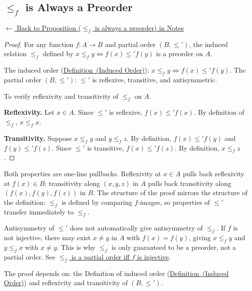 
\subsection*{$\leq_f$ is Always a Preorder}
\label{prf:induced-preorder}

\begin{remark*}[Return]
\hyperref[prop:induced-preorder]{$\leftarrow$ Back to Proposition ($\leq_f$ is always a preorder) in Notes}
\end{remark*}

\begin{proof}
\Claim For any function $f : A \to B$ and partial order $(B, \leq')$, the induced relation $\leq_f$ defined by $x \leq_f y \Leftrightarrow f(x) \leq' f(y)$ is a preorder on $A$.

\Given The induced order (\hyperref[def:induced-order]{Definition~(Induced Order)}):
$x \leq_f y \Leftrightarrow f(x) \leq' f(y)$. The partial order $(B, \leq')$:
$\leq'$ is reflexive, transitive, and antisymmetric.

\Goal To verify reflexivity and transitivity of $\leq_f$ on $A$.

\medskip
\noindent\textbf{Reflexivity.} Let $x \in A$. Since $\leq'$ is reflexive,
$f(x) \leq' f(x)$. By definition of $\leq_f$, $x \leq_f x$.

\medskip
\noindent\textbf{Transitivity.} Suppose $x \leq_f y$ and $y \leq_f z$. By
definition, $f(x) \leq' f(y)$ and $f(y) \leq' f(z)$. Since $\leq'$ is
transitive, $f(x) \leq' f(z)$. By definition, $x \leq_f z$. \AsReq
\end{proof}

\begin{remark*}
Both properties are one-line pullbacks. Reflexivity at $x \in A$ pulls back
reflexivity at $f(x) \in B$; transitivity along $(x, y, z)$ in $A$ pulls back
transitivity along $(f(x), f(y), f(z))$ in $B$. The structure of the proof
mirrors the structure of the definition: $\leq_f$ is defined by comparing
$f$-images, so properties of $\leq'$ transfer immediately to $\leq_f$.
\end{remark*}

\begin{remark*}
Antisymmetry of $\leq'$ does not automatically give antisymmetry of $\leq_f$.
If $f$ is not injective, there may exist $x \neq y$ in $A$ with $f(x) = f(y)$,
giving $x \leq_f y$ and $y \leq_f x$ with $x \neq y$. This is why
$\leq_f$ is only guaranteed to be a preorder, not a partial order.
See \hyperref[prop:induced-poset]{$\leq_f$ is a partial order iff $f$ is injective}.
\end{remark*}

\begin{remark*}[Dependencies]
The proof depends on: the Definition of induced order
(\hyperref[def:induced-order]{Definition~(Induced Order)}) and reflexivity and
transitivity of $(B, \leq')$.
\end{remark*}
